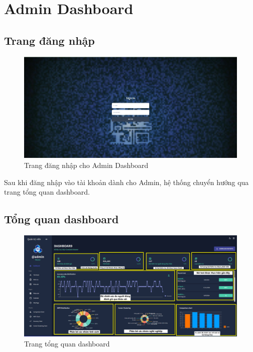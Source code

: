 \section{Admin Dashboard}
\subsection{Trang đăng nhập}

\begin{figure}[H]
    \centering
    \includegraphics[width=0.8\linewidth]{images/dashboardLogin.png}
    \vspace{0.6cm}
    \caption{Trang đăng nhập cho Admin Dashboard}
\end{figure}

Sau khi đăng nhập vào tài khoản dành cho Admin, hệ thống chuyển hướng qua trang tổng quan dashboard.

\subsection{Tổng quan dashboard}

\begin{figure}[H]
    \centering
    \includegraphics[width=0.9\linewidth]{images/dashboard.png}
    \vspace{0.6cm}
    \caption{Trang tổng quan dashboard}
\end{figure}

